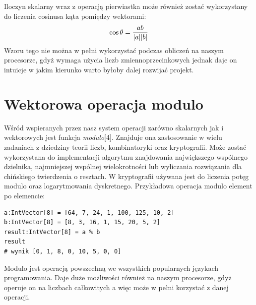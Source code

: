Iloczyn skalarny wraz z operacją pierwiastka może również zostać wykorzystany do liczenia cosinusa kąta pomiędzy wektorami:
$$ \cos{\theta} = \frac{ab}{\lvert a\rvert \lvert b\rvert} $$
Wzoru tego nie można w pełni wykorzystać podczas obliczeń na naszym procesorze, gdyż wymaga użycia liczb zmiennoprzecinkowych jednak daje on intuicje w jakim kierunko warto byłoby dalej rozwijać projekt.
\section{Wektorowa operacja modulo}
Wśród wspieranych przez nasz system operacji zarówno skalarnych jak i wektorowych jest funkcja \textit{modulo}[4]. Znajduje ona zastosowanie w wielu zadaniach z dziedziny teorii liczb, kombinatoryki oraz kryptografii. Może zostać wykorzystana do implementacji algorytmu znajdowania największego wspólnego dzielnika, najmniejszej wspólnej wielokrotności lub wyliczania rozwiązania dla chińskiego twierdzenia o resztach. W kryptografii używana jest do liczenia potęg modulo oraz logarytmowania dyskretnego.
Przykładowa operacja modulo element po elemencie: 
\begin{lstlisting}[frame=single]
a:IntVector[8] = [64, 7, 24, 1, 100, 125, 10, 2]
b:IntVector[8] = [8, 3, 16, 1, 15, 20, 5, 2]
result:IntVector[8] = a % b
result
# wynik [0, 1, 8, 0, 10, 5, 0, 0]
\end{lstlisting}
Modulo jest operacją powszechną we wszystkich popularnych językach programowania. Daje duże możliwości również na naszym procesorze, gdyż operuje on na liczbach całkowitych a więc może w pełni korzystać z danej operacji.